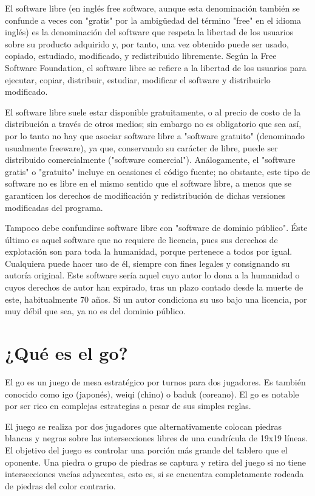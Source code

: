 \documentclass[12pt,a4paper]{report}
\begin{document}
El software libre (en inglés free software, aunque esta denominación también se
confunde a veces con "gratis" por la ambigüedad del término "free" en el idioma
inglés) es la denominación del software que respeta la libertad de los usuarios
sobre su producto adquirido y, por tanto, una vez obtenido puede ser usado,
copiado, estudiado, modificado, y redistribuido libremente. Según la Free
Software Foundation, el software libre se refiere a la libertad de los usuarios
para ejecutar, copiar, distribuir, estudiar, modificar el software y
distribuirlo modificado.

El software libre suele estar disponible gratuitamente, o al precio de costo de
la distribución a través de otros medios; sin embargo no es obligatorio que sea
así, por lo tanto no hay que asociar software libre a "software gratuito"
(denominado usualmente freeware), ya que, conservando su carácter de libre,
puede ser distribuido comercialmente ("software comercial"). Análogamente, el
"software gratis" o "gratuito" incluye en ocasiones el código fuente; no
obstante, este tipo de software no es libre en el mismo sentido que el software
libre, a menos que se garanticen los derechos de modificación y redistribución
de dichas versiones modificadas del programa.

Tampoco debe confundirse software libre con "software de dominio público". Éste
último es aquel software que no requiere de licencia, pues sus derechos de
explotación son para toda la humanidad, porque pertenece a todos por igual.
Cualquiera puede hacer uso de él, siempre con fines legales y consignando su
autoría original. Este software sería aquel cuyo autor lo dona a la humanidad o
cuyos derechos de autor han expirado, tras un plazo contado desde la muerte de
este, habitualmente 70 años. Si un autor condiciona su uso bajo una licencia,
por muy débil que sea, ya no es del dominio público.


\section{¿Qué es el go?}

El go es un juego de mesa estratégico por turnos para dos jugadores. Es 
también conocido como igo (japonés), weiqi (chino) o baduk (coreano). El go 
es notable por ser rico en complejas estrategias a pesar de sus simples reglas.

El juego se realiza por dos jugadores que alternativamente colocan piedras
blancas y negras sobre las intersecciones libres de una cuadrícula de 19x19
líneas. El objetivo del juego es controlar una porción más grande del tablero
que el oponente. Una piedra o grupo de piedras se captura y retira del juego si
no tiene intersecciones vacías adyacentes, esto es, si se encuentra
completamente rodeada de piedras del color contrario.
\end{document}
